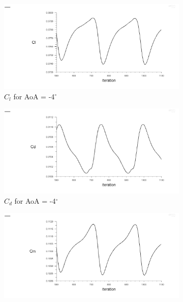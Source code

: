 \begin{figure}[H]
  \begin{subfigure}[b]{0.5\textwidth}
    \includegraphics[width=\textwidth]{-4_deg/AoA_-4_cl.png}
    \caption{$C_l$ for AoA = -4$^\circ$}
    \label{fig:aoa_-4_cl}
  \end{subfigure}
  \hfill
  \begin{subfigure}[b]{0.5\textwidth}
    \includegraphics[width=\textwidth]{-4_deg/AoA_-4_cd.png}
    \caption{$C_d$ for AoA = -4$^\circ$}
    \label{fig:aoa_-4_cd}
  \end{subfigure}
  \begin{subfigure}[b]{0.5\textwidth}
    \includegraphics[width=\textwidth]{-4_deg/AoA_-4_cm.png}

\end{subfigure}
\end{figure}
